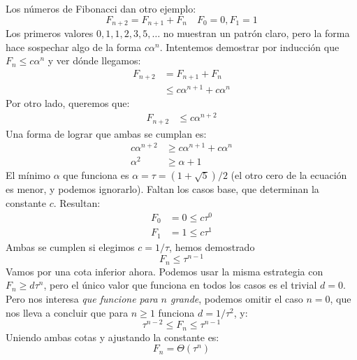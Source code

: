   Los números de Fibonacci dan otro ejemplo:
  \begin{equation*}
    F_{n + 2}
      = F_{n + 1} + F_n
      \quad F_0 = 0, F_1 = 1
  \end{equation*}
  Los primeros valores
  \(0, 1, 1, 2, 3, 5, \dotsc\) no muestran un patrón claro,
  pero la forma hace sospechar algo de la forma \(c \alpha^n\).
  Intentemos demostrar por inducción que \(F_n \le c \alpha^n\)
  y ver dónde llegamos:
  \begin{align*}
    F_{n + 2}
      &=   F_{n + 1} + F_n \\
      &\le c \alpha^{n + 1} + c \alpha^n
  \end{align*}
  Por otro lado,
  queremos que:
  \begin{align*}
    F_{n + 2}
      &\le c \alpha^{n + 2}
  \end{align*}
  Una forma de lograr que ambas se cumplan es:
  \begin{align*}
    c \alpha^{n + 2}
      &\ge c \alpha^{n + 1} + c \alpha^n \\
    \alpha^2
      &\ge \alpha + 1
  \end{align*}
  El mínimo \(\alpha\) que funciona es \(\alpha = \tau = (1 + \sqrt{5}) / 2\)
  (el otro cero de la ecuación es menor,
   y podemos ignorarlo).
  Faltan los casos base,
  que determinan la constante \(c\).
  Resultan:
  \begin{align*}
    F_0
      &= 0 \le c \tau^0 \\
    F_1
      &= 1 \le c \tau^1
  \end{align*}
  Ambas se cumplen si elegimos \(c = 1 / \tau\),
  hemos demostrado
  \begin{equation*}
    F_n
      \le \tau^{n - 1}
  \end{equation*}
  Vamos por una cota inferior ahora.
  Podemos usar la misma estrategia con \(F_n \ge d \tau^n\),
  pero el único valor que funciona en todos los casos es el trivial \(d = 0\).
  Pero nos interesa \emph{que funcione para \(n\) grande},
  podemos omitir el caso \(n = 0\),
  que nos lleva a concluir que para \(n \ge 1\) funciona \(d = 1 / \tau^2\),
  y:
  \begin{equation*}
    \tau^{n - 2}
      \le F_n
      \le \tau^{n - 1}
  \end{equation*}
  Uniendo ambas cotas y ajustando la constante es:
  \begin{equation*}
    F_n
      = \Theta(\tau^n)
  \end{equation*}

